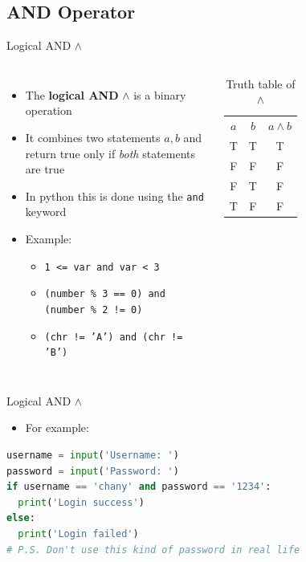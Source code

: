 \documentclass[10pt,xcolor={table,dvipsnames},t]{beamer}
\begin{document}
\subsection{AND Operator}

\begin{frame}{Logical AND $\land$}
  \begin{columns}
    \begin{itemize}
      \item The \textbf{logical AND} $\land$ is a binary operation
      \item It combines two statements $a,b$ and return true only if \textit{both} statements are true 
      \item In python this is done using the \texttt{and} keyword
      \item Example:
      \begin{itemize}
        \item \texttt{1 <= var and var < 3} 
        \item \texttt{(number \% 3 == 0)  and (number \% 2 != 0)}
        \item \texttt{(chr != 'A') and (chr != 'B')}
      \end{itemize}
    \end{itemize}
    \begin{table}[]
      \begin{tabular}{ccc}
      $a$ & $b$ & $a\land b$  \\
      T & T & T \\
      F & F & F \\
      F & T & F\\
      T & F & F
      \end{tabular}
      \caption{Truth table of $\land$}
      \end{table}
  \end{columns}
\end{frame}

\begin{frame}[fragile]{Logical AND $\land$}
  \begin{itemize}
    \item For example:
  \end{itemize}
\begin{lstlisting}[language=python]
username = input('Username: ')
password = input('Password: ')
if username == 'chany' and password == '1234': 
  print('Login success')
else:
  print('Login failed')
# P.S. Don't use this kind of password in real life 
\end{lstlisting}
\end{frame}
\end{document}
